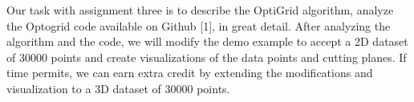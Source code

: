 Our task with assignment three is to describe the OptiGrid algorithm, analyze the Optogrid code available on Github [1], in great detail. 
After analyzing the algorithm and the code, we will modify the demo example to accept a 2D dataset of 30000 points and create visualizations of the data points and cutting planes. 
If time permits, we can earn extra credit by extending the modifications and visualization to a 3D dataset of 30000 points.